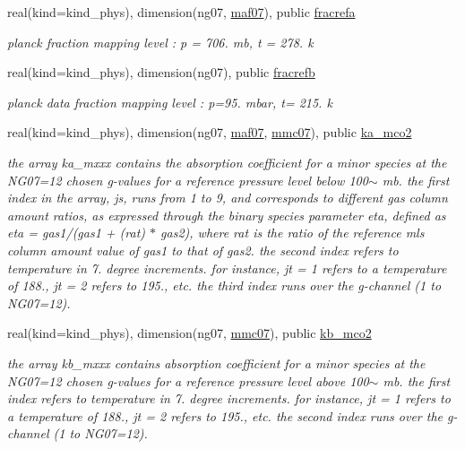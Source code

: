 \begin{Indent}
\begin{DoxyCompactItemize}
real(kind=kind\+\_\+phys), dimension(ng07, \hyperlink{group__module__radlw__kgbnn_ga21ac454fe21fb07ee555b4106121b2ae}{maf07}), public \hyperlink{group__module__radlw__kgbnn_ga07f2a4a0f1152a65aed68623f14a9ae4}{fracrefa}
\begin{DoxyCompactList}\small\item\em planck fraction mapping level \+: p = 706. mb, t = 278. k \end{DoxyCompactList}\item 
real(kind=kind\+\_\+phys), dimension(ng07), public \hyperlink{group__module__radlw__kgbnn_gaa16eb60406e5a298e380b55af528791a}{fracrefb}
\begin{DoxyCompactList}\small\item\em planck data fraction mapping level \+: p=95. mbar, t= 215. k \end{DoxyCompactList}\item 
real(kind=kind\+\_\+phys), dimension(ng07, \hyperlink{group__module__radlw__kgbnn_ga21ac454fe21fb07ee555b4106121b2ae}{maf07}, \hyperlink{group__module__radlw__kgbnn_ga2d176bec938d9fdcc2369fda91308702}{mmc07}), public \hyperlink{group__module__radlw__kgbnn_ga3fdad494f3d3fcf9306da6a81d97bd43}{ka\+\_\+mco2}
\begin{DoxyCompactList}\small\item\em the array ka\+\_\+mxxx contains the absorption coefficient for a minor species at the N\+G07=12 chosen g-\/values for a reference pressure level below 100$\sim$ mb. the first index in the array, js, runs from 1 to 9, and corresponds to different gas column amount ratios, as expressed through the binary species parameter eta, defined as eta = gas1/(gas1 + (rat) $\ast$ gas2), where rat is the ratio of the reference mls column amount value of gas1 to that of gas2. the second index refers to temperature in 7. degree increments. for instance, jt = 1 refers to a temperature of 188., jt = 2 refers to 195., etc. the third index runs over the g-\/channel (1 to N\+G07=12). \end{DoxyCompactList}\item 
real(kind=kind\+\_\+phys), dimension(ng07, \hyperlink{group__module__radlw__kgbnn_ga2d176bec938d9fdcc2369fda91308702}{mmc07}), public \hyperlink{group__module__radlw__kgbnn_ga2dcfbe76332d559cda48c7ba065ab349}{kb\+\_\+mco2}
\begin{DoxyCompactList}\small\item\em the array kb\+\_\+mxxx contains absorption coefficient for a minor species at the N\+G07=12 chosen g-\/values for a reference pressure level above 100$\sim$ mb. the first index refers to temperature in 7. degree increments. for instance, jt = 1 refers to a temperature of 188., jt = 2 refers to 195., etc. the second index runs over the g-\/channel (1 to N\+G07=12). \end{DoxyCompactList}\end{DoxyCompactItemize}
\end{Indent}
